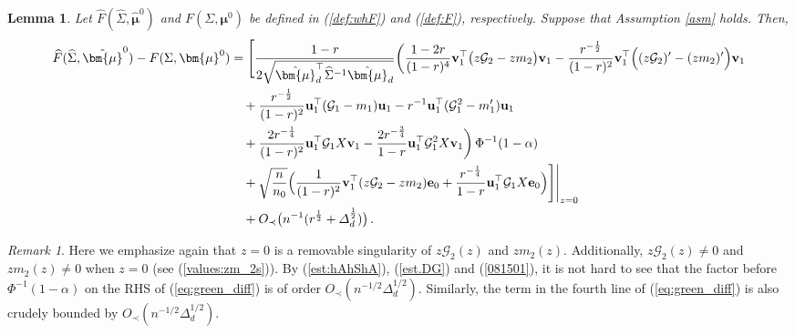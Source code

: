 \documentclass[12pt]{article}
\numberwithin{equation}{section}
\newtheorem{lem}{Lemma}
\theoremstyle{remark}
\newtheorem{myRem}{Remark}
\newcommand{\1}{{\rm 1}\kern-0.24em{\rm I}}
\begin{document}
\begin{appendices}
\begin{lem} \label{lem:green_diff}
Let $\widehat{F}(\widehat\Sigma, \hat{\bm{\mu}}^0)$ and $F(\Sigma, {\bm{\mu}}^0)$  be defined in (\ref{def:whF}) and (\ref{def:F}), respectively. Suppose that Assumption \ref{asm} holds. Then, 
\begin{align}\label{eq:green_diff}
 \widehat{F}(\widehat\Sigma, \hat{\bm{\mu}}^0)- F(\Sigma, {\bm{\mu}}^0) &=\Bigg[\frac{1-r}{2\sqrt{   \hat {\bm{\mu}}_d^{\top} \widehat\Sigma^{-1} \hat {\bm{\mu}}_d}}\bigg(\frac{1-2r}{(1-r)^4} {\bf v}_1^{\top} \big( z\mathcal{G}_2-zm_2\big){\bf v}_1  - \frac{r^{-\frac 12}}{(1-r)^2} {\bf v}_1^{\top}\Big((z\mathcal{G}_2)'-(zm_2)'\Big){\bf v}_1 \notag\\
& \quad  +  \frac{r^{-\frac 12}}{(1-r)^2} {\bf u}_1^{\top}(\mathcal{G}_1-m_1){\bf u}_1 - r^{-1}{\bf u}_1^{\top}(\mathcal{G}_1^2- m_1'){\bf u}_1 \notag\\
&\quad +  \frac{2r^{-\frac 14}}{(1-r)^2} {\bf u}_1^{\top}\mathcal{G}_1 {X}{\bf v}_1 - \frac{2r^{-\frac 34}}{1-r}  {\bf u}_1^{\top} \mathcal{G}_1^2 {X}{\bf v}_1
 \bigg) \, \Phi^{-1}(1-\alpha) \notag\\
& \quad +  \sqrt{\frac{n}{n_0}} \Big( \frac{1}{(1-r)^2} {\bf v}_1^{\top}(z\mathcal{G}_2-zm_2){\bf e}_0+ \frac{r^{-\frac 14}}{1-r} {\bf u}_1^{\top}\mathcal{G}_1 {X}{\bf e}_0\Big)\Bigg]\Bigg|_{z=0}\notag\\
&\quad+   O_\prec \big(n^{-1}(r^{\frac 12} +\varDelta_d^{\frac 12} )\big)  \,.
\end{align}


\end{lem}

\begin{myRem} \label{rmk:green_diff}
Here we emphasize again that  $z=0$ is a removable singularity of $z\mathcal{G}_2(z)$ and  $zm_2(z)$. Additionally,  $z\mathcal{G}_2(z)\neq 0$ and  $zm_2(z)\neq 0$ when $z=0$ (see (\ref{values:zm_2s})). By (\ref{est:hAhShA}), (\ref{est.DG})  and (\ref{081501}), it is not hard to see that the factor before $ \Phi^{-1}(1-\alpha)$ on the RHS of (\ref{eq:green_diff}) is of order $O_\prec(n^{-1/2} \varDelta_d^{1/2})$. Similarly,  the term in the fourth line of (\ref{eq:green_diff}) is also crudely bounded  by $O_\prec(n^{-1/2} \varDelta_d^{1/2})$. 
\end{myRem} 



\end{appendices}
\end{document}
